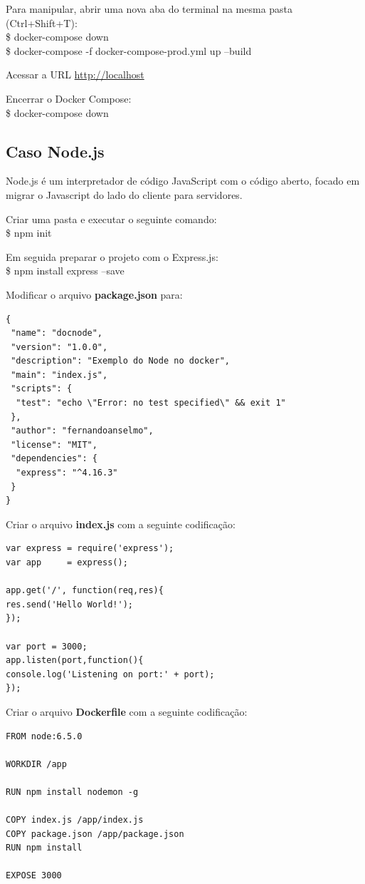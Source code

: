 \documentclass[a4paper,11pt]{article}
\begin{document}
Para manipular, abrir uma nova aba do terminal na mesma pasta (Ctrl+Shift+T): \\
{\ttfamily\$ docker-compose down \\
\$ docker-compose -f docker-compose-prod.yml up --build}

Acessar a URL \url{http://localhost}

Encerrar o Docker Compose: \\
{\ttfamily\$ docker-compose down}

\subsection{Caso Node.js}
Node.js é um interpretador de código JavaScript com o código aberto, focado em migrar o Javascript do lado do cliente para servidores. 

Criar uma pasta e executar o seguinte comando: \\
{\ttfamily\$ npm init}

Em seguida preparar o projeto com o Express.js: \\
{\ttfamily\$ npm install express --save}

Modificar o arquivo \textbf{package.json} para:
\begin{lstlisting}
{
 "name": "docnode",
 "version": "1.0.0",
 "description": "Exemplo do Node no docker",
 "main": "index.js",
 "scripts": {
  "test": "echo \"Error: no test specified\" && exit 1"
 },
 "author": "fernandoanselmo",
 "license": "MIT",
 "dependencies": {
  "express": "^4.16.3"
 }
}
\end{lstlisting}

Criar o arquivo \textbf{index.js} com a seguinte codificação:
\begin{lstlisting}
var express = require('express');
var app     = express();

app.get('/', function(req,res){
res.send('Hello World!');
});

var port = 3000;
app.listen(port,function(){
console.log('Listening on port:' + port);
});
\end{lstlisting}

Criar o arquivo \textbf{Dockerfile} com a seguinte codificação:
\begin{lstlisting}
FROM node:6.5.0

WORKDIR /app

RUN npm install nodemon -g

COPY index.js /app/index.js
COPY package.json /app/package.json
RUN npm install

EXPOSE 3000
\end{lstlisting}
\end{document}
